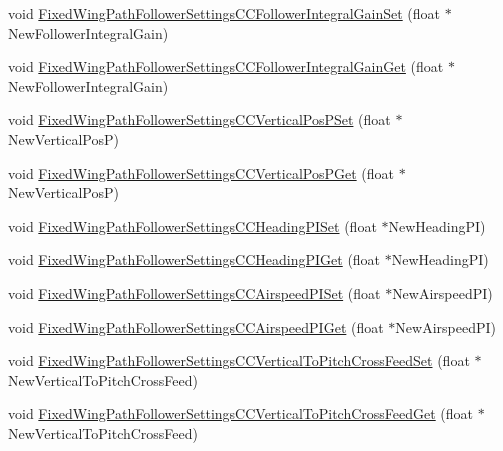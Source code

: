 \begin{DoxyCompactItemize}
\item 
void \hyperlink{group___fixed_wing_path_follower_settings_c_c_ga17866f4b7c7e3b0a2e3245a761389971}{\-Fixed\-Wing\-Path\-Follower\-Settings\-C\-C\-Follower\-Integral\-Gain\-Set} (float $\ast$\-New\-Follower\-Integral\-Gain)
\item 
void \hyperlink{group___fixed_wing_path_follower_settings_c_c_gab4128b520c0a033d184cc61074f5d72c}{\-Fixed\-Wing\-Path\-Follower\-Settings\-C\-C\-Follower\-Integral\-Gain\-Get} (float $\ast$\-New\-Follower\-Integral\-Gain)
\item 
void \hyperlink{group___fixed_wing_path_follower_settings_c_c_gabc0ab72b3ec72b262be6e42d4519233c}{\-Fixed\-Wing\-Path\-Follower\-Settings\-C\-C\-Vertical\-Pos\-P\-Set} (float $\ast$\-New\-Vertical\-Pos\-P)
\item 
void \hyperlink{group___fixed_wing_path_follower_settings_c_c_ga101766fba7f8261b7d7eae5c5d8faed6}{\-Fixed\-Wing\-Path\-Follower\-Settings\-C\-C\-Vertical\-Pos\-P\-Get} (float $\ast$\-New\-Vertical\-Pos\-P)
\item 
void \hyperlink{group___fixed_wing_path_follower_settings_c_c_ga067e4b2aa46e97c6499d44c8503e8f52}{\-Fixed\-Wing\-Path\-Follower\-Settings\-C\-C\-Heading\-P\-I\-Set} (float $\ast$\-New\-Heading\-P\-I)
\item 
void \hyperlink{group___fixed_wing_path_follower_settings_c_c_gab600d9a0dc1d4e876a8477a2c4e8a905}{\-Fixed\-Wing\-Path\-Follower\-Settings\-C\-C\-Heading\-P\-I\-Get} (float $\ast$\-New\-Heading\-P\-I)
\item 
void \hyperlink{group___fixed_wing_path_follower_settings_c_c_ga28f76f4741d28fd586964f0bef690ce9}{\-Fixed\-Wing\-Path\-Follower\-Settings\-C\-C\-Airspeed\-P\-I\-Set} (float $\ast$\-New\-Airspeed\-P\-I)
\item 
void \hyperlink{group___fixed_wing_path_follower_settings_c_c_gaba124ff6d326461e78696ba88fb39d02}{\-Fixed\-Wing\-Path\-Follower\-Settings\-C\-C\-Airspeed\-P\-I\-Get} (float $\ast$\-New\-Airspeed\-P\-I)
\item 
void \hyperlink{group___fixed_wing_path_follower_settings_c_c_gaba86377ffa17a7c367dab66bed195ad5}{\-Fixed\-Wing\-Path\-Follower\-Settings\-C\-C\-Vertical\-To\-Pitch\-Cross\-Feed\-Set} (float $\ast$\-New\-Vertical\-To\-Pitch\-Cross\-Feed)
\item 
void \hyperlink{group___fixed_wing_path_follower_settings_c_c_gadc5d65c32d85e032999bcefab57bf588}{\-Fixed\-Wing\-Path\-Follower\-Settings\-C\-C\-Vertical\-To\-Pitch\-Cross\-Feed\-Get} (float $\ast$\-New\-Vertical\-To\-Pitch\-Cross\-Feed)

\end{DoxyCompactItemize}
